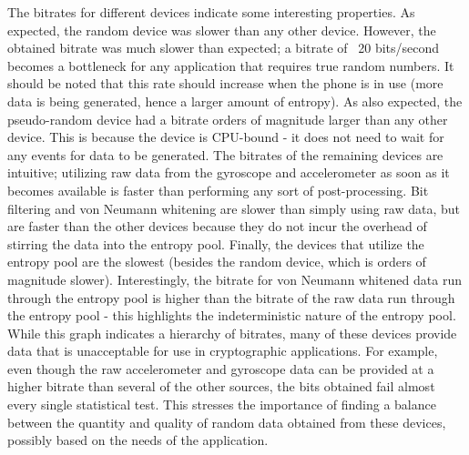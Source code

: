 The bitrates for different devices indicate some interesting properties.  As
expected, the random device was slower than any other device.  However, the
obtained bitrate was much slower than expected; a bitrate of ~20 bits/second
becomes a bottleneck for any application that requires true random numbers.  It
should be noted that this rate should increase when the phone is in use (more
data is being generated, hence a larger amount of entropy).  As also expected,
the pseudo-random device had a bitrate orders of magnitude larger than any other
device.  This is because the device is CPU-bound - it does not need to wait for
any events for data to be generated.  The bitrates of the remaining devices are
intuitive; utilizing raw data from the gyroscope and accelerometer as soon as it
becomes available is faster than performing any sort of post-processing.  Bit
filtering and von Neumann whitening are slower than simply using raw data, but
are faster than the other devices because they do not incur the overhead of
stirring the data into the entropy pool.  Finally, the devices that utilize the
entropy pool are the slowest (besides the random device, which is orders of
magnitude slower).  Interestingly, the bitrate for von Neumann whitened data run
through the entropy pool is higher than the bitrate of the raw data run through
the entropy pool - this highlights the indeterministic nature of the entropy
pool.  While this graph indicates a hierarchy of bitrates, many of these devices
provide data that is unacceptable for use in cryptographic applications.  For
example, even though the raw accelerometer and gyroscope data can be provided
at a higher bitrate than several of the other sources, the bits obtained fail
almost every single statistical test.  This stresses the importance of finding a
balance between the quantity and quality of random data obtained from these
devices, possibly based on the needs of the application.
